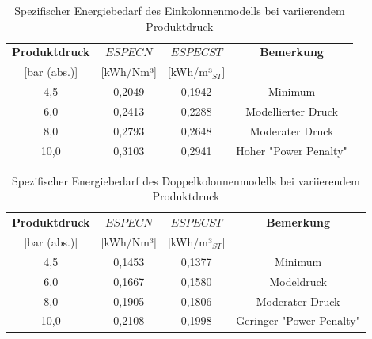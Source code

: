 \begin{landscape}
\centering

\end{landscape}



\begin{landscape}
\centering

\end{landscape}



\begin{table}[H]
\centering
\caption{Spezifischer Energiebedarf des Einkolonnenmodells bei variierendem Produktdruck}
\label{tab:spez_energie_single}
\begin{tabular}{cccc}
\hline
\textbf{Produktdruck} & \textbf{$ESPECN$} & \textbf{$ESPECST$} & \textbf{Bemerkung} \\
{[bar (abs.)]} & {[kWh/Nm³]} & {[kWh/m³$_{ST}$]} & \\ \hline
4,5 & 0,2049 & 0,1942 & Minimum \\
6,0 & 0,2413 & 0,2288 & Modellierter Druck \\
8,0 & 0,2793 & 0,2648 & Moderater Druck \\
10,0 & 0,3103 & 0,2941 & Hoher "Power Penalty" \\ \hline
\end{tabular}
\end{table}

\begin{table}[htbp]
\centering
\caption{Spezifischer Energiebedarf des Doppelkolonnenmodells bei variierendem Produktdruck}
\label{tab:spez_energie_doppel}
\begin{tabular}{cccc}
\hline
\textbf{Produktdruck} & \textbf{$ESPECN$} & \textbf{$ESPECST$} & \textbf{Bemerkung} \\
{[bar (abs.)]} & {[kWh/Nm³]} & {[kWh/m³$_{ST}$]} & \\ \hline
4,5 & 0,1453 & 0,1377 & Minimum\\
6,0 & 0,1667 & 0,1580 & Modeldruck \\
8,0 & 0,1905 & 0,1806 & Moderater Druck \\
10,0 & 0,2108 & 0,1998 & Geringer "Power Penalty" \\ \hline
\end{tabular}
\end{table}

